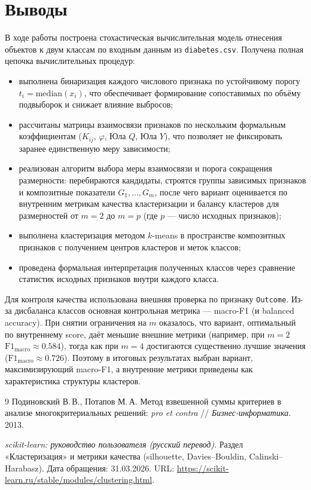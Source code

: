 \documentclass[a4paper, 14pt]{extarticle}
\begin{document}
\section{Выводы}
В ходе работы построена стохастическая вычислительная модель отнесения объектов к двум классам по входным данным из \texttt{diabetes.csv}. Получена полная цепочка вычислительных процедур:
\begin{itemize}
  \item выполнена бинаризация каждого числового признака по устойчивому порогу \(t_i=\mathrm{median}(x_i)\), что обеспечивает формирование сопоставимых по объёму подвыборок и снижает влияние выбросов;
  \item рассчитаны матрицы взаимосвязи признаков по нескольким формальным коэффициентам (\(K_{ij}\), \(\varphi\), Юла \(Q\), Юла \(Y\)), что позволяет не фиксировать заранее единственную меру зависимости;
  \item реализован алгоритм выбора меры взаимосвязи и порога сокращения размерности: перебираются кандидаты, строятся группы зависимых признаков и композитные показатели \(G_1,\dots,G_m\), после чего вариант оценивается по внутренним метрикам качества кластеризации и балансу кластеров для размерностей от \(m=2\) до \(m=p\) (где \(p\) --- число исходных признаков);
  \item выполнена кластеризация методом \(k\)-means в пространстве композитных признаков с получением центров кластеров и меток классов;
  \item проведена формальная интерпретация полученных классов через сравнение статистик исходных признаков внутри каждого класса.
\end{itemize}

Для контроля качества использована внешняя проверка по признаку \texttt{Outcome}. Из-за дисбаланса классов основная контрольная метрика --- macro-F1 (и balanced accuracy). При снятии ограничения на \(m\) оказалось, что вариант, оптимальный по внутреннему score, даёт меньшие внешние метрики (например, при \(m=2\) \(\mathrm{F1_{macro}}\approx 0.584\)), тогда как при \(m=4\) достигаются существенно лучшие значения (\(\mathrm{F1_{macro}}\approx 0.726\)). Поэтому в итоговых результатах выбран вариант, максимизирующий macro-F1, а внутренние метрики приведены как характеристика структуры кластеров.

\begin{thebibliography}{9}
Подиновский В.\,В., Потапов М.\,А. Метод взвешенной суммы критериев в анализе многокритериальных решений: \textit{pro et contra} // \textit{Бизнес-информатика}. 2013.

\textit{scikit-learn: руководство пользователя (русский перевод)}. Раздел «Кластеризация» и метрики качества (silhouette, Davies--Bouldin, Calinski--Harabasz). Дата обращения: 31.03.2026. 
URL: \url{https://scikit-learn.ru/stable/modules/clustering.html}.
\end{thebibliography}
\end{document}
